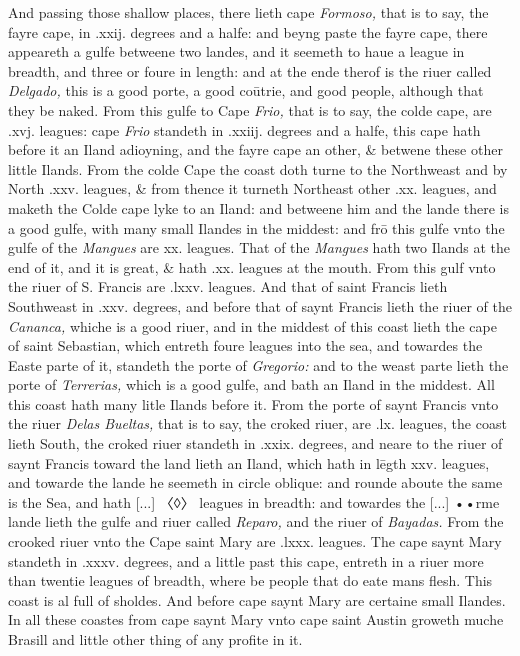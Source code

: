 \documentclass[11pt,twoside]{article}\makeatletter
\def\gap{}
\begin{document}
	\normalmarginpar
      \par
And passing those shallow places, there lieth cape {\itshape Formoso,} that is to say, the fayre cape, in .xxij. degrees and a halfe: and beyng paste the fayre cape, there appeareth a gulfe betweene two landes, and it seemeth to haue a league in breadth, and three or foure in length: and at the ende therof is the riuer cal­led {\itshape Delgado,} this is a good porte, a good coūtrie, and good peo­ple, although that they be naked. From this gulfe to Cape {\itshape Frio,} that is to say, the colde cape, are .xvj. leagues: cape {\itshape Frio} standeth in .xxiij. degrees and a halfe, this cape hath before it an Iland adioyning, and the fayre cape an other, \& betwene these other little Ilands. From the colde Cape the coast doth turne to the Northweast and by North .xxv. leagues, \& from thence it turneth Northeast other .xx. leagues, and maketh the Colde cape lyke to an Iland: and betweene him and the lande there is a good gulfe, with many small Ilandes in the 
	\normalmarginpar
       middest: and frō this gulfe vnto the gulfe of the {\itshape Mangues} are xx. leagues. That of the {\itshape Mangues} hath two Ilands at the end of it, and it is great, \& hath .xx. leagues at the mouth. From this gulf vnto the riuer of S. Francis are .lxxv. leagues. And that of saint Francis lieth Southweast in .xxv. degrees, and before that of saynt Francis lieth the riuer of the {\itshape Cananca,} whiche is a good riuer, and in the middest of this coast lieth the cape of saint Sebastian, which entreth foure leagues into the sea, and towardes the Easte parte of it, standeth the porte of 
	\normalmarginpar
       {\itshape Gregorio:} and to the weast parte lieth the porte of {\itshape Terrerias,} which is a good gulfe, and bath an Iland in the middest. All this coast hath many litle Ilands before it. From the porte of saynt Francis vnto the riuer {\itshape Delas Bueltas,} that is to say, the croked riuer, are .lx. leagues, the coast lieth South, the croked riuer standeth in .xxix. degrees, and neare to the riuer of saynt %
 Francis toward the land lieth an Iland, which hath in lēgth xxv. leagues, and towarde the lande he seemeth in circle ob­lique: and rounde aboute the same is the Sea, and hath [...] {\gap 〈◊〉} leagues in breadth: and towardes the [...] {\gap ••}rme lande lieth the gulfe and riuer called {\itshape Reparo,} and the riuer of {\itshape Bayadas.} From the crooked riuer vnto the Cape saint Mary are .lxxx. leagues. The cape saynt Mary standeth in .xxxv. degrees, and a little past this cape, entreth in a riuer more than twentie leagues of breadth, where be people that do eate mans flesh. This coast is al full of sholdes. And before cape saynt Mary are certaine small Ilandes. In all these coastes from cape saynt Mary vnto cape saint Austin groweth muche Brasill and little o­ther thing of any profite in it.\par
\end{document}
